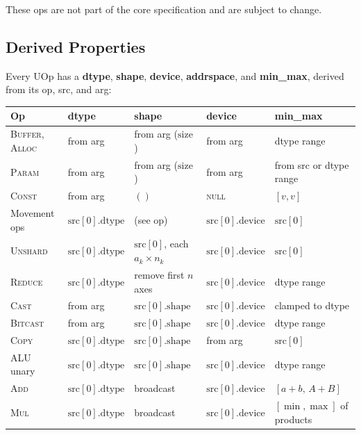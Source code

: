 \documentclass[10pt,letterpaper]{article}
\newcommand{\op}[1]{\textsc{#1}}
\begin{document}
\smallskip
These ops are not part of the core specification and are subject to change.

\subsection*{Derived Properties}

Every UOp has a \textbf{dtype}, \textbf{shape}, \textbf{device}, \textbf{addrspace}, and \textbf{min\_max}, derived from its op, src, and arg:

\medskip
\begin{tabular}{@{}l l l l l@{}}
\toprule
\textbf{Op} & \textbf{dtype} & \textbf{shape} & \textbf{device} & \textbf{min\_max} \\
\midrule
\op{Buffer}, \op{Alloc} & from arg & from arg ($\mathrm{size}$) & from arg & dtype range \\
\op{Param} & from arg & from arg ($\mathrm{size}$) & from arg & from src or dtype range \\
\op{Const} & from arg & $()$ & \textsc{null} & $[v, v]$ \\[3pt]
Movement ops & $\mathrm{src}[0].\mathrm{dtype}$ & (see op) & $\mathrm{src}[0].\mathrm{device}$ & $\mathrm{src}[0]$ \\
\op{Unshard} & $\mathrm{src}[0].\mathrm{dtype}$ & $\mathrm{src}[0]$, each $a_k \times n_k$ & $\mathrm{src}[0].\mathrm{device}$ & $\mathrm{src}[0]$ \\
\op{Reduce} & $\mathrm{src}[0].\mathrm{dtype}$ & remove first $n$ axes & $\mathrm{src}[0].\mathrm{device}$ & dtype range \\[3pt]
\op{Cast} & from arg & $\mathrm{src}[0].\mathrm{shape}$ & $\mathrm{src}[0].\mathrm{device}$ & clamped to dtype \\
\op{Bitcast} & from arg & $\mathrm{src}[0].\mathrm{shape}$ & $\mathrm{src}[0].\mathrm{device}$ & dtype range \\
\op{Copy} & $\mathrm{src}[0].\mathrm{dtype}$ & $\mathrm{src}[0].\mathrm{shape}$ & from arg & $\mathrm{src}[0]$ \\
ALU unary & $\mathrm{src}[0].\mathrm{dtype}$ & $\mathrm{src}[0].\mathrm{shape}$ & $\mathrm{src}[0].\mathrm{device}$ & dtype range \\
\op{Add} & $\mathrm{src}[0].\mathrm{dtype}$ & broadcast & $\mathrm{src}[0].\mathrm{device}$ & $[a+b,\, A+B]$ \\
\op{Mul} & $\mathrm{src}[0].\mathrm{dtype}$ & broadcast & $\mathrm{src}[0].\mathrm{device}$ & $[\min,\max]$ of products \\

\end{tabular}
\end{document}
